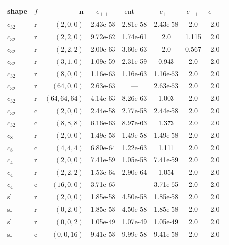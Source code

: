 \begin{center}\footnotesize
\begin{tabular}{@{}llrccccc@{}}
\toprule
shape & $f$ & $\mathbf{n}$ & $e_{++}$ & $\mathrm{ent}_{++}$ & $e_{+-}$ & $e_{-+}$ & $e_{--}$\\
\midrule
$c_{32}$ & r & $(2,0,0)$    & 2.43e-58 & 2.81e-58 & 2.43e-58 & 2.0 & 2.0\\
$c_{32}$ & r & $(2,2,0)$    & 9.72e-62 & 1.74e-61 & 2.0 & 1.115 & 2.0\\
$c_{32}$ & r & $(2,2,2)$    & 2.00e-63 & 3.60e-63 & 2.0 & 0.567 & 2.0\\
$c_{32}$ & r & $(3,1,0)$    & 1.09e-59 & 2.31e-59 & 0.943 & 2.0 & 2.0\\
$c_{32}$ & r & $(8,0,0)$    & 1.16e-63 & 1.16e-63 & 1.16e-63 & 2.0 & 2.0\\
$c_{32}$ & r & $(64,0,0)$   & 2.63e-63 & --- & 2.63e-63 & 2.0 & 2.0\\
$c_{32}$ & r & $(64,64,64)$ & 4.14e-63 & 8.26e-63 & 1.003 & 2.0 & 2.0\\
$c_{32}$ & c & $(2,0,0)$    & 2.44e-58 & 2.77e-58 & 2.44e-58 & 2.0 & 2.0\\
$c_{32}$ & c & $(8,8,8)$    & 6.16e-63 & 8.97e-63 & 1.373 & 2.0 & 2.0\\
$c_{8}$  & r & $(2,0,0)$    & 1.49e-58 & 1.49e-58 & 1.49e-58 & 2.0 & 2.0\\
$c_{8}$  & c & $(4,4,4)$    & 6.80e-64 & 1.22e-63 & 1.111 & 2.0 & 2.0\\
$c_{4}$  & r & $(2,0,0)$    & 7.41e-59 & 1.05e-58 & 7.41e-59 & 2.0 & 2.0\\
$c_{4}$  & r & $(2,2,2)$    & 1.53e-64 & 2.90e-64 & 1.054 & 2.0 & 2.0\\
$c_{4}$  & c & $(16,0,0)$   & 3.71e-65 & --- & 3.71e-65 & 2.0 & 2.0\\
sl & r & $(2,0,0)$   & 1.85e-58 & 4.50e-58 & 1.85e-58 & 2.0 & 2.0\\
sl & r & $(0,2,0)$   & 1.85e-58 & 4.50e-58 & 1.85e-58 & 2.0 & 2.0\\
sl & r & $(0,0,2)$   & 1.05e-49 & 1.07e-49 & 1.05e-49 & 2.0 & 2.0\\
sl & c & $(0,0,16)$  & 9.41e-58 & 9.99e-58 & 9.41e-58 & 2.0 & 2.0\\
\bottomrule
\end{tabular}
\end{center}

